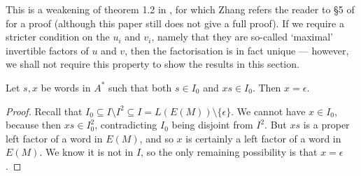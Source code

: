 \documentclass[noindex,noinsetproof,emphthm,12pt]{lmaths}
\begin{document}
This is a weakening of theorem 1.2 in \cite{Zhang1992}, for which Zhang refers the reader to \S5 of \cite{Otto1991} for a proof (although this paper still does not give a full proof). If we require a stricter condition on the $u_i$ and $v_i$, namely that they are so-called `maximal' invertible factors of $u$ and $v$, then the factorisation is in fact unique --- however, we shall not require this property to show the results in this section.

\begin{lemma}
	Let $s, x$ be words in $A^*$ such that both $s \in I_0$ and $xs \in I_0$. Then $x = \epsilon$. \label{lma:I0-suffix-code}
\end{lemma}
\begin{proof}
	Recall that $I_0 \subseteq I \setminus I^2 \subseteq I = L(E(M)) \setminus \{\epsilon\}$. We cannot have $x \in I_0$, because then $xs \in I_0^2$, contradicting $I_0$ being disjoint from $I^2$. But $xs$ is a proper left factor of a word in $E(M)$, and so $x$ is certainly a left factor of a word in $E(M)$. We know it is not in $I$, so the only remaining possibility is that $x = \epsilon$.
\end{proof}
\end{document}
